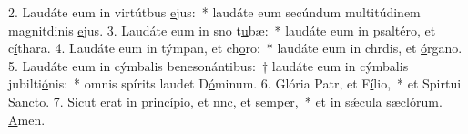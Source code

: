 2. Laudáte eum in virtútbus \uline{e}jus:~* laudáte eum secúndum multitúdinem magnitdinis \uline{e}jus.
3. Laudáte eum in sno t\uline{u}bæ:~* laudáte eum in psaltéro, et c\uline{í}thara.
4. Laudáte eum in týmpan, et ch\uline{o}ro:~* laudáte eum in chrdis, et \uline{ó}rgano.
5. Laudáte eum in cýmbalis benesonántibus:~† laudáte eum in cýmbalis jubilti\uline{ó}nis:~* omnis spírits laudet D\uline{ó}minum.
6. Glória Patr, et F\uline{í}lio,~* et Spirtui S\uline{a}ncto.
7. Sicut erat in princípio, et nnc, et s\uline{e}mper,~* et in sǽcula sæclórum. \uline{A}men.
